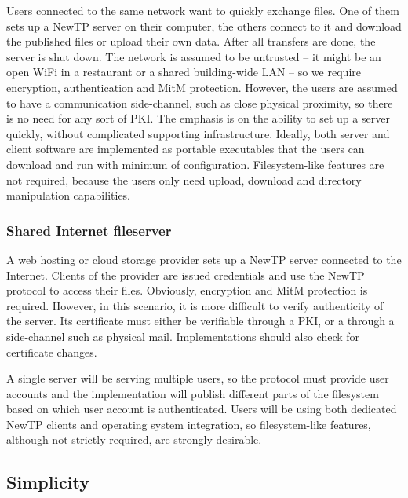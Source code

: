 Users connected to the same network want to quickly exchange files. One of them sets up a NewTP server on
their computer, the others connect to it and download the published files or upload their own data. After all
transfers are done, the server is shut down. The network is assumed to be untrusted -- it might be an open WiFi
in a restaurant or a shared building-wide LAN -- so we require encryption, authentication and MitM protection.
However, the users are assumed to have a communication side-channel, such as close physical proximity, so
there is no need for any sort of PKI. The emphasis is on the ability to set up a server quickly, without
complicated supporting infrastructure. Ideally, both server and client software are implemented as portable
executables that the users can download and run with minimum of configuration. Filesystem-like features are
not required, because the users only need upload, download and directory manipulation capabilities.

%

\subsubsection{Shared Internet fileserver}

A web hosting or cloud storage provider sets up a NewTP server connected to the Internet. Clients of the
provider are issued credentials and use the NewTP protocol to access their files. Obviously, encryption and
MitM protection is required. However, in this scenario, it is more difficult to verify authenticity of the
server. Its certificate must either be verifiable through a PKI, or a through a side-channel such as physical
mail.  Implementations should also check for certificate changes.

A single server will be serving multiple users, so the protocol must provide user accounts and the
implementation will publish different parts of the filesystem based on which user account is authenticated.
Users will be using both dedicated NewTP clients and operating system integration, so filesystem-like
features, although not strictly required, are strongly desirable.

%

\subsection{Simplicity}

